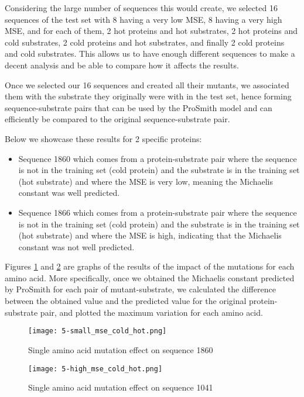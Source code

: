 Considering the large number of sequences this would create, we selected 16 sequences of the test set with
8 having a very low MSE, 8 having a very high MSE, and for each of them, 2 hot proteins and hot substrates, 
2 hot proteins and cold substrates, 2 cold proteins and hot substrates, and finally 2 cold proteins and
cold substrates. This allows us to have enough different sequences to make a decent analysis and be
able to compare how it affects the results. 

Once we selected our 16 sequences and created all their mutants, we associated them with the substrate they
originally were with in the test set, hence forming sequence-substrate pairs that can be used by the ProSmith
model and can efficiently be compared to the original sequence-substrate pair.

Below we showcase these results for 2 specific proteins: 
\begin{itemize}
    \item Sequence 1860 which comes from a protein-substrate
    pair where the sequence is not in the training set (cold protein) and the substrate is in the training set 
    (hot substrate) and where the MSE is very low, meaning the Michaelis constant was well predicted.
    \item Sequence 1866 which comes from a protein-substrate pair where the sequence is not in the training set
    (cold protein) and the substrate is in the training set (hot substrate) and where the MSE is high,
    indicating that the Michaelis constant was not well predicted.
\end{itemize}

Figures \ref{fig:seq1860} and \ref{fig:seq1866} are graphs of the results of the impact of the mutations for each amino acid. More specifically, once we obtained the Michaelis constant predicted by ProSmith for each pair of mutant-substrate, we calculated the difference between the obtained value and the predicted value for the original protein-substrate pair, and plotted the maximum variation for each amino acid.

\begin{figure}
    \centering
    \texttt{[image: 5-small\_mse\_cold\_hot.png]}
    \caption{Single amino acid mutation effect on sequence 1860}
    \label{fig:seq1860}
  \end{figure}

\begin{figure}
    \centering
    \texttt{[image: 5-high\_mse\_cold\_hot.png]}
    \caption{Single amino acid mutation effect on sequence 1041}
    \label{fig:seq1866}
  \end{figure}

